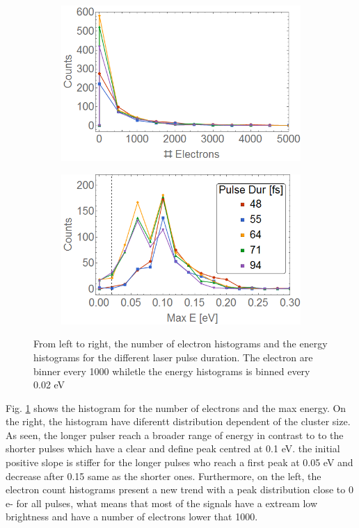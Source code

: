 \begin{figure}[h!]
\hfill
\begin{subfigure}[l]{0.48\textwidth}
\includegraphics[width=1\textwidth]{../Images/results/MIR_Ne_pulseduration/HElec.png} 
\end{subfigure} 
\begin{subfigure}[l]{0.48\textwidth}
\includegraphics[width=1\textwidth]{../Images/results/MIR_Ne_pulseduration/HEnerg.png} 
\end{subfigure} \hfill
\caption[MIR Ne pulse duration. Histograms]{From left to right, the number of electron histograms and the energy histograms for the different laser pulse duration. The electron are binner every 1000 whiletle the energy histograms is binned every 0.02 eV }
\label{fig:NeonpulseHisto}
\end{figure}

Fig. \ref{fig:NeonpulseHisto} shows the histogram for the number of electrons  and the max energy. On the right, the histogram have diferentt distribution dependent of the cluster size. As seen, the longer pulser reach a broader range of energy in contrast to to the shorter pulses which have a clear and define peak centred at 0.1 eV. the initial positive slope is stiffer for the longer pulses who reach a first peak at 0.05 eV and decrease after 0.15 same as the shorter ones. Furthermore, on the left, the electron count histograms present a new trend with a peak distribution close to 0 e- for all pulses, what means that most of the signals have a extream low brightness and have a number of electrons lower that 1000.

